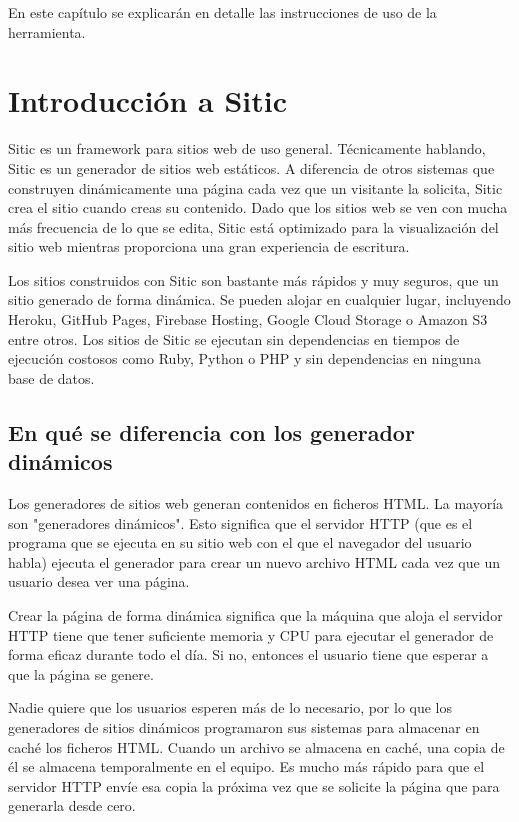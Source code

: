 En este capítulo se explicarán en detalle las instrucciones de uso de la herramienta.

\section{Introducción a Sitic}

Sitic es un framework para sitios web de uso general. Técnicamente hablando, Sitic es un generador de sitios web estáticos.
A diferencia de otros sistemas que construyen dinámicamente una página cada vez que un visitante la solicita, Sitic crea el sitio
cuando creas su contenido. Dado que los sitios web se ven con mucha más frecuencia de lo que se edita,
Sitic está optimizado para la visualización del sitio web mientras proporciona una gran experiencia de escritura.

Los sitios construidos con Sitic son bastante más rápidos y muy seguros, que un sitio generado de forma dinámica.
Se pueden alojar en cualquier lugar, incluyendo Heroku, GitHub Pages, Firebase Hosting, Google Cloud Storage o Amazon
S3 entre otros. Los sitios de Sitic se ejecutan sin dependencias en tiempos de ejecución costosos como Ruby, Python
o PHP y sin dependencias en ninguna base de datos.

\subsection{En qué se diferencia con los generador dinámicos}

Los generadores de sitios web generan contenidos en ficheros HTML. La mayoría son "generadores dinámicos".
Esto significa que el servidor HTTP (que es el programa que se ejecuta en su sitio web con el que el navegador del
usuario habla) ejecuta el generador para crear un nuevo archivo HTML cada vez que un usuario desea ver una página.

Crear la página de forma dinámica significa que la máquina que aloja el servidor HTTP tiene que tener suficiente
memoria y CPU para ejecutar el generador de forma eficaz durante todo el día. Si no, entonces el usuario tiene que
esperar a que la página se genere.

Nadie quiere que los usuarios esperen más de lo necesario, por lo que los generadores de sitios dinámicos programaron
sus sistemas para almacenar en caché los ficheros HTML. Cuando un archivo se almacena en caché, una copia de él se
almacena temporalmente en el equipo. Es mucho más rápido para que el servidor HTTP envíe esa copia la próxima vez que
se solicite la página que para generarla desde cero.

